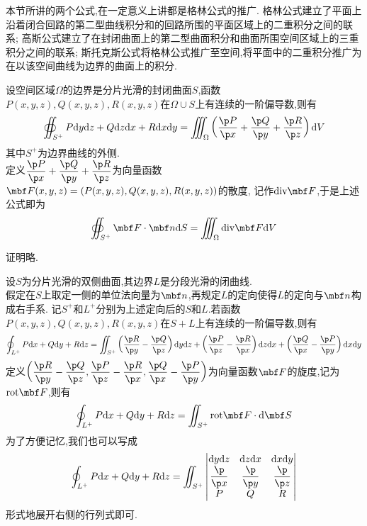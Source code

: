 \documentclass{ctexart}
\begin{document}
\pagestyle{empty}
\begin{center}\large{}\end{center}
本节所讲的两个公式,在一定意义上讲都是格林公式的推广.%
格林公式建立了平面上沿着闭合回路的第二型曲线积分和的回路所围的平面区域上的二重积分之间的联系;%
高斯公式建立了在封闭曲面上的第二型曲面积分和曲面所围空间区域上的三重积分之间的联系;%
斯托克斯公式将格林公式推广至空间,将平面中的二重积分推广为在以该空间曲线为边界的曲面上的积分.\\
\begin{formal}[1.1 高斯公式]
    设空间区域$\Omega$的边界是分片光滑的封闭曲面$S$,函数$P(x,y,z),Q(x,y,z),R(x,y,z)$在$\Omega\cup S$上有连续的一阶偏导数,则有
    \[\oiint_{S^+}P\di y\di z+Q\di z\dx+R\dx\di y=\iiint_{\Omega}\left(\dfrac{\p P}{\p x}+\dfrac{\p Q}{\p y}+\dfrac{\p R}{\p z}\right)\di V\]
    其中$S^+$为边界曲线的外侧.\\
    定义$\dfrac{\p P}{\p x}+\dfrac{\p Q}{\p y}+\dfrac{\p R}{\p z}$为向量函数$\mbf F(x,y,z)=\left(P(x,y,z),Q(x,y,z),R(x,y,z)\right)$的散度,%
    记作$\text{div}\mbf F$,于是上述公式即为
    \[\oiint_{S^+}\mbf F\cdot\mbf n\di S=\iiint_{\Omega}\text{div}\mbf F\di V\]
\end{formal}\noindent
证明略.\\
\begin{formal}[2.1 斯托克斯公式]
    设$S$为分片光滑的双侧曲面,其边界$L$是分段光滑的闭曲线.\\
    假定在$S$上取定一侧的单位法向量为$\mbf n$,再规定$L$的定向使得$L$的定向与$\mbf n$构成右手系.%
    记$S^+$和$L^+$分别为上述定向后的$S$和$L$.若函数$P(x,y,z),Q(x,y,z),R(x,y,z)$在$S+L$上有连续的一阶偏导数,则有
    \[\oint_{L^+}P\dx+Q\di y+R\di z=\iint_{S^+}\left(\dfrac{\p R}{\p y}-\dfrac{\p Q}{\p z}\right)\di y\di z+\left(\dfrac{\p P}{\p z}-\dfrac{\p R}{\p x}\right)\di z\di x+\left(\dfrac{\p Q}{\p x}-\dfrac{\p P}{\p y}\right)\dx\di y\]
    定义$\left(\dfrac{\p R}{\p y}-\dfrac{\p Q}{\p z},\dfrac{\p P}{\p z}-\dfrac{\p R}{\p x},\dfrac{\p Q}{\p x}-\dfrac{\p P}{\p y}\right)$为向量函数$\mbf F$的旋度,记为$\text{rot}\mbf F$,则有
    \[\oint_{L^+}P\dx+Q\di y+R\di z=\iint_{S^+}\text{rot}\mbf F\cdot\di \mbf S\]
    为了方便记忆,我们也可以写成
    \[\oint_{L^+}P\dx+Q\di y+R\di z=\iint_{S^+}\begin{vmatrix}
        \di y\di z&\di z\di x&\di x\di y\\
        \dfrac{\p}{\p x}&\dfrac{\p}{\p y}&\dfrac{\p}{\p z}\\
        P&Q&R
    \end{vmatrix}\]
    形式地展开右侧的行列式即可.
\end{formal}
\end{document}

